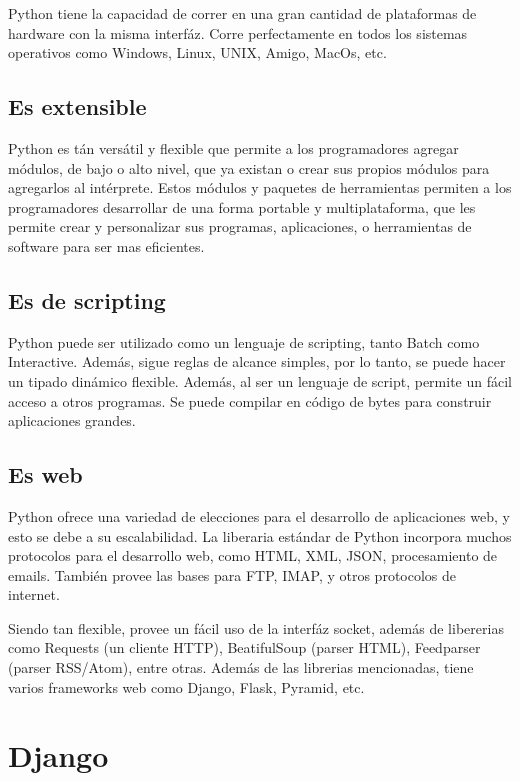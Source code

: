 Python tiene la capacidad de correr en una gran cantidad de plataformas de hardware con la misma interfáz. Corre perfectamente en todos los sistemas operativos como Windows, Linux, UNIX, Amigo, MacOs, etc.

\subsection[Es extensible]{Es extensible}

Python es tán versátil y flexible que permite a los programadores agregar módulos, de bajo o alto nivel, que ya existan o crear sus propios módulos para agregarlos al intérprete. Estos módulos y paquetes de herramientas permiten a los programadores desarrollar de una forma portable y multiplataforma, que les permite crear y personalizar sus programas, aplicaciones, o herramientas de software para ser mas eficientes. 

\subsection[Es de scripting]{Es de scripting}
Python puede ser utilizado como un lenguaje de scripting, tanto Batch como Interactive. Además, sigue reglas de alcance simples, por lo tanto, se puede hacer un tipado dinámico flexible. Además, al ser un lenguaje de script, permite un fácil acceso a otros programas. Se puede compilar en código de bytes para construir aplicaciones grandes.

\subsection[Es web]{Es web}
Python ofrece una variedad de elecciones para el desarrollo de aplicaciones web, y esto se debe a su escalabilidad. La liberaria estándar de Python incorpora muchos protocolos para el desarrollo web, como HTML, XML, JSON, procesamiento de emails. También provee las bases para FTP, IMAP, y otros protocolos de internet.

Siendo tan flexible, provee un fácil uso de la interfáz socket, además de libererias como Requests (un cliente HTTP), BeatifulSoup (parser HTML), Feedparser (parser RSS/Atom), entre otras. Además de las librerias mencionadas, tiene varios frameworks web como Django, Flask, Pyramid, etc. 


\section[Django]{Django}

